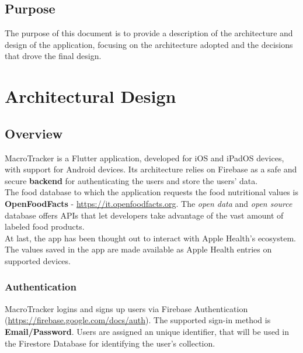 \documentclass{Configuration_Files/PoliMi3i_thesis}
\begin{document}
\section{Purpose}
The purpose of this document is to provide a description of the architecture and design of the application, focusing on the architecture adopted and the decisions that drove the final design. 

\chapter{Architectural Design}
\section{Overview}
MacroTracker is a Flutter application, developed for iOS and iPadOS devices, with support for Android devices. 
Its architecture relies on Firebase as a safe and secure \textbf{backend} for authenticating the users and store the users' data. \\
The food database to which the application requests the food nutritional values is \textbf{OpenFoodFacts} - \url{https://it.openfoodfacts.org}. The \textit{open data} and \textit{open source} database offers APIs that let developers take advantage of the vast amount of labeled food products. \\
At last, the app has been thought out to interact with Apple Health's ecosystem. The values saved in the app are made available as Apple Health entries on supported devices. 
\subsection{Authentication}
MacroTracker logins and signs up users via Firebase Authentication (\url{https://firebase.google.com/docs/auth}). The supported sign-in method is \textbf{Email/Password}. Users are assigned an unique identifier, that will be used in the Firestore Database for identifying the user's collection. 
\end{document}
